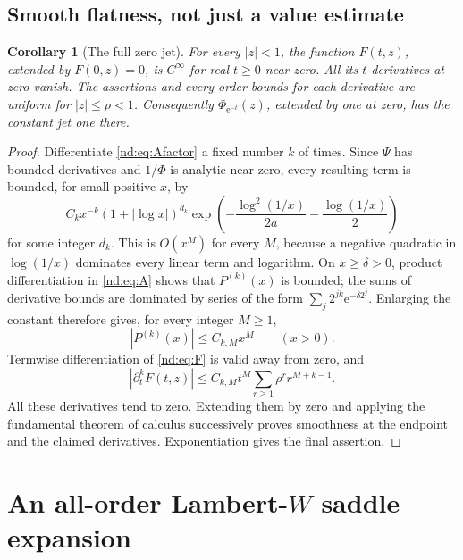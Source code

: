 \documentclass[11pt,a4paper,oneside,openany]{book}
\numberwithin{equation}{chapter}
\newtheorem{corollary}[theorem]{Corollary}
\theoremstyle{definition}
\theoremstyle{remark}
\newcommand{\e}{\mathrm e}
\begin{document}
\section{Smooth flatness, not just a value estimate}
\begin{corollary}[The full zero jet]
\label{nd:cor:smoothflat}
For every \(|z|<1\), the function \(F(t,z)\), extended by \(F(0,z)=0\), is
\(C^\infty\) for real \(t\ge0\) near zero. All its \(t\)-derivatives at zero
vanish. The assertions and every-order bounds for each derivative are uniform
for \(|z|\le\rho<1\). Consequently \(\Phi_{\e^{-t}}(z)\), extended by one at
zero, has the constant jet one there.
\end{corollary}
\begin{proof}
Differentiate \eqref{nd:eq:Afactor} a fixed number \(k\) of times. Since
\(\Psi\) has bounded derivatives and \(1/\Phi\) is analytic near zero, every
resulting term is bounded, for small positive \(x\), by
\[
 C_k x^{-k}(1+|\log x|)^{d_k}
       \exp\left(-\frac{\log^2(1/x)}{2a}-\frac{\log(1/x)}2\right)
\]
for some integer \(d_k\). This is \(O(x^M)\) for every \(M\), because a
negative quadratic in \(\log(1/x)\) dominates every linear term and logarithm.
On \(x\ge\delta>0\), product differentiation in \eqref{nd:eq:A} shows that
\(P^{(k)}(x)\) is bounded; the sums of derivative bounds are dominated by
series of the form \(\sum_j2^{jk}\e^{-\delta2^j}\). Enlarging the constant
therefore gives, for every integer \(M\ge1\),
\[
 |P^{(k)}(x)|\le C_{k,M}x^M\qquad(x>0).
\]
Termwise differentiation of \eqref{nd:eq:F} is valid away from zero, and
\[
 |\partial_t^kF(t,z)|\le C_{k,M}t^M
                 \sum_{r\ge1}\rho^r r^{M+k-1}.
\]
All these derivatives tend to zero. Extending them by zero and applying the
fundamental theorem of calculus successively proves smoothness at the endpoint
and the claimed derivatives. Exponentiation gives the final assertion.
\end{proof}
\chapter{An all-order Lambert-\texorpdfstring{\(W\)}{W} saddle expansion}
\label{nd:sec:saddle}
\end{document}
